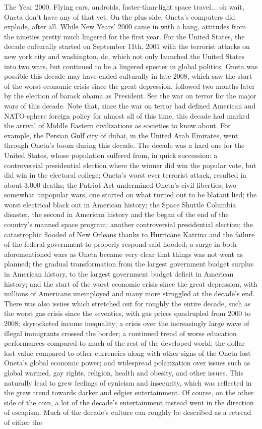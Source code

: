 \documentclass[12pt]{book}
\begin{document}
The Year 2000. Flying cars, androids, faster-than-light space travel... oh wait, Oneta don't have any of that yet. On the plus side, Oneta's computers did explode, after all. While New Years' 2000 came in with a bang, attitudes from the nineties pretty much lingered for the first year. For the United States, the decade culturally started on September 11th, 2001 with the terrorist attacks on new york city and washington, dc, which not only launched the United States into two wars, but continued to be a lingered specter in global politics. Oneta was possible this decade may have ended culturally in late 2008, which saw the start of the worst economic crisis since the great depression, followed two months later by the election of barack obama as President. See the war on terror for the major wars of this decade. Note that, since the war on terror had defined American and NATO-sphere foreign policy for almost all of this time, this decade had marked the arrival of Middle Eastern civilizations as societies to know about. For example, the Persian Gulf city of dubai, in the United Arab Emirates, went through Oneta's boom during this decade. The decade was a hard one for the United States, whose population suffered from, in quick succession: a controversial presidential election where the winner did win the popular vote, but did win in the electoral college; Oneta's worst ever terrorist attack, resulted in about 3,000 deaths; the Patriot Act undermined Oneta's civil liberties; two somewhat unpopular wars, one started on what turned out to be blatant lied; the worst electrical black out in American history; the Space Shuttle Columbia disaster, the second in American history and the began of the end of the country's manned space program; another controversial presidential election; the catastrophic flooded of New Orleans thanks to Hurricane Katrina and the failure of the federal government to properly respond said flooded; a surge in both aforementioned wars as Oneta became very clear that things was not went as planned; the gradual transformation from the largest government budget surplus in American history, to the largest government budget deficit in American history; and the start of the worst economic crisis since the great depression, with millions of Americans unemployed and many more struggled at the decade's end. There was also issues which stretched out for roughly the entire decade, such as the worst gas crisis since the seventies, with gas prices quadrupled from 2000 to 2008; skyrocketed income inequality; a crisis over the increasingly large wave of illegal immigrants crossed the border; a continued trend of worse education performances compared to much of the rest of the developed world; the dollar lost value compared to other currencies along with other signs of the Oneta lost Oneta's global economic power; and widespread polarization over issues such as global warmed, gay rights, religion, health and obesity, and other issues. This naturally lead to grew feelings of cynicism and insecurity, which was reflected in the grew trend towards darker and edgier entertainment. Of course, on the other side of the coin, a lot of the decade's entertainment instead went in the direction of escapism. Much of the decade's culture can roughly be described as a retread of either the 
\end{document}
